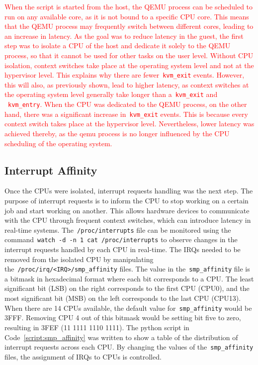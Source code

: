 \documentclass[MMR,Master,english]{twbook}
\begin{document}
\textcolor{red}{\noindent When the script is started from the host, the QEMU process can be scheduled to run on any available core, as it is not bound to a specific CPU core. This means that the QEMU process may frequently switch between different cores, leading to an increase in latency. As the goal was to reduce latency in the guest, the first step was to isolate a CPU of the host and dedicate it solely to the QEMU process, so that it cannot be used for other tasks on the user level. Without CPU isolation, context switches take place at the operating system level and not at the hypervisor level. This explains why there are fewer~\texttt{kvm\_exit} events. However, this will also, as previously shown, lead to higher latency, as context switches at the operating system level generally take longer than a~\texttt{kvm\_exit} and ~\texttt{kvm\_entry}. When the CPU was dedicated to the QEMU process, on the other hand, there was a significant increase in~\texttt{kvm\_exit} events. This is because every context switch takes place at the hypervisor level. Nevertheless, lower latency was achieved thereby, as the qemu process is no longer influenced by the CPU scheduling of the operating system.}

\subsection{Interrupt Affinity}\label{subsec:irq_handling}
Once the CPUs were isolated, interrupt requests handling was the next step. The purpose of interrupt requests is to inform the CPU to stop working on a certain job and start working on another. This allows hardware devices to communicate with the CPU through frequent context switches, which can introduce latency in real-time systems. The~\texttt{/proc/interrupts} file can be monitored using the command~\texttt{watch -d -n 1 cat /proc/interrupts} to observe changes in the interrupt requests handled by each CPU in real-time. The IRQs needed to be removed from the isolated CPU by manipulating the~\texttt{/proc/irq/<IRQ>/smp\_affinity} files. The value in the~\texttt{smp\_affinity} file is a bitmask in hexadecimal format where each bit corresponds to a CPU. The least significant bit (LSB) on the right corresponds to the first CPU (CPU0), and the most significant bit (MSB) on the left corresponds to the last CPU (CPU13). When there are 14 CPUs available, the default value for~\texttt{smp\_affinity} would be 3FFF. Removing CPU 4 out of this bitmask would be setting bit five to zero, resulting in 3FEF (11 1111 1110 1111). The python script in Code~\ref{script:smp_affinity} was written to show a table of the distribution of interrupt requests across each CPU. By changing the values of the~\texttt{smp\_affinity} files, the assignment of IRQs to CPUs is controlled.
\end{document}
